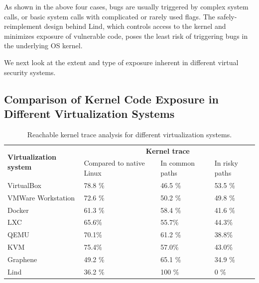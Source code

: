 {{{As shown in the above four cases, bugs are usually triggered by
complex system calls,
or basic system calls with complicated or rarely used flags.
The safely-reimplement design behind Lind, which controls access to the kernel and
minimizes exposure of vulnerable code, poses
the least risk of triggering bugs in the underlying OS kernel. 

We next look at the extent and type of exposure inherent in different
virtual security systems.

\subsection{Comparison of Kernel Code Exposure in Different Virtualization
Systems}
\label{Reachable-Kernel-Trace-Analysis-for-Different-Virtualization-Systems}

\begin{table}
\centering
\scriptsize
\caption{\small Reachable kernel trace analysis for different virtualization
systems.}
\begin{tabular}{|l|l|l|l|}
  \hline
  \multirow{3}{1.5cm}{\bf Virtualization system} & \multicolumn{3}{c|}{\bf Kernel trace} \\ \cline{2-4}
  & \multirow{2}{1.5cm}{Compared to native Linux} & \multirow{2}{1.5cm}{In common paths} & \multirow{2}{1cm}{In risky paths} \\
  & & & \\  \hline
  VirtualBox & 78.8 \% & 46.5 \% & 53.5 \% \\
  \hline
  \multirow{2}{1.5cm}{VMWare Workstation} & \multirow{2}{*}{72.6 \%} &
  \multirow{2}{*}{50.2 \%} & \multirow{2}{*}{49.8 \%} \\
  & & & \\   \hline
  Docker & 61.3 \% & 58.4 \% & 41.6 \% \\
  \hline
  LXC &  65.6\% &  55.7\% &  44.3\% \\
  \hline
   QEMU &  70.1\% & 61.2 \% &  38.8\% \\
  \hline
   KVM &  75.4\% &  57.0\% &  43.0\% \\
  \hline
  Graphene & 49.2 \% & 65.1 \% & 34.9 \% \\
  \hline
  Lind & 36.2 \% & 100 \% & 0 \% \\
  \hline
\end{tabular}
\label{table:trace-systems}
\end{table}

}}}
